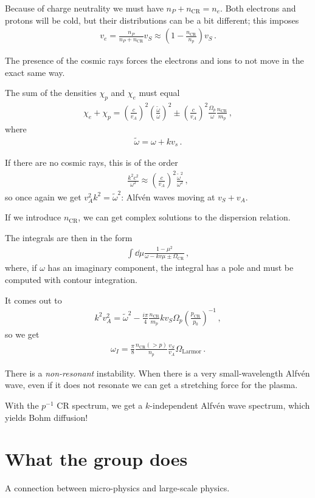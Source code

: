\documentclass[main.tex]{subfiles}
\begin{document}
Because of charge neutrality we must have \(n_P + n _{\text{CR}} = n_e\).
Both electrons and protons will be cold, but their distributions 
can be a bit different; 
this imposes 
%
\begin{align}
v_e = \frac{n_P}{n_P + n _{\text{CR}}} v_S \approx \left(1 - \frac{n _{\text{CR}}}{n_p}\right) v_S
\,.
\end{align}

The presence of the cosmic rays forces the electrons and ions to not move in the exact same way. 

The sum of the densities \(\chi _p\) and \(\chi _e\) must equal 
%
\begin{align}
\chi _e + \chi _p = \left(\frac{c}{v_A}\right)^2 \left(\frac{\widetilde{\omega}}{\omega }\right)^{2} \pm \left(\frac{c}{v_A}\right)^2 \frac{\Omega _p}{\omega } \frac{n _{\text{CR}}}{m_p}
\,,
\end{align}
%
where 
%
\begin{align}
\widetilde{\omega} = \omega + k v_s
\,.
\end{align}

If there are no cosmic rays, this is of the order 
%
\begin{align}
\frac{k^2 c^2}{\omega^2} \approx 
\left(\frac{c}{v_A}\right)^2 
\frac{\widetilde{\omega}^2}{\omega^2} 
\,,
\end{align}
%
so once again we get \(v_A^2 k^2 = \widetilde{\omega}^2\): 
Alfvén waves moving at \(v_S + v_A\). 

If we introduce \(n _{\text{CR}}\), we can get complex solutions to the dispersion relation. 

The integrals are then in the form 
%
\begin{align}
\int \dd{\mu } \frac{1 - \mu^2}{\omega - kv \mu \pm \Omega _{\text{CR}}}
\,,
\end{align}
%
where, if \(\omega \) has an imaginary component, the integral has a 
pole and must be computed with contour integration. 

It comes out to 
%
\begin{align}
k^2 v_A^2 = \widetilde{\omega}^2 - \frac{i \pi }{4} \frac{n _{\text{CR}}}{m_p} k v_S \Omega _p \left(\frac{p _{\text{CR}}}{p_0 }\right)^{-1} 
\,,
\end{align}
%
so we get 
%
\begin{align}
\omega _I = \frac{\pi }{8} \frac{n _{\text{CR}}(>p)}{n_p} \frac{v_S}{v_A} \Omega _{\text{Larmor}}
\,.
\end{align}

There is a \emph{non-resonant} instability. 
When there is a very small-wavelength Alfvén wave, 
even if it does not resonate we can get a stretching force for the plasma. 

With the \(p^{-1}\) CR spectrum, we get a \(k\)-independent Alfvén wave spectrum, which yields Bohm diffusion! 

\section{What the group does}

A connection between micro-physics and large-scale physics. 
\end{document}
